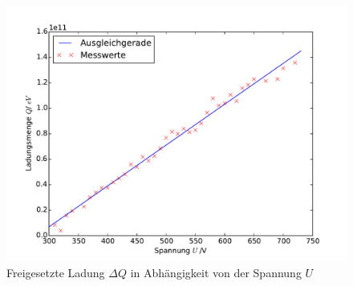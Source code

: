 \begin{figure}
  \centering
  \includegraphics[scale=0.8]{auswertung/d.pdf}
\caption{Freigesetzte Ladung $\Delta Q$ in Abhängigkeit von der Spannung $U$}
  \label{fig:ladung}
\end{figure}

